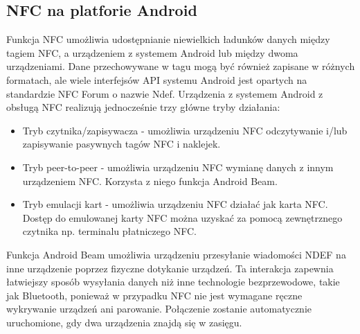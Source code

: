 \documentclass{article}
\numberwithin{equation}{section}
\begin{document}
\subsection{NFC na platforie Android}
Funkcja NFC umożliwia udostępnianie niewielkich ładunków danych między tagiem NFC, a urządzeniem z systemem Android lub między dwoma urządzeniami. Dane przechowywane w tagu mogą być również zapisane w różnych formatach, ale wiele interfejsów API systemu Android jest opartych na standardzie NFC Forum o nazwie Ndef. Urządzenia z systemem Android z obsługą NFC realizują jednocześnie trzy główne tryby działania:
\begin{itemize}
\item Tryb czytnika/zapisywacza - umożliwia urządzeniu NFC odczytywanie i/lub zapisywanie pasywnych tagów NFC i naklejek.
\item Tryb peer-to-peer - umożliwia urządzeniu NFC wymianę danych z innym urządzeniem NFC. Korzysta z niego funkcja Android Beam.
\item Tryb emulacji kart - umożliwia urządzeniu NFC działać jak karta NFC. Dostęp do emulowanej karty NFC można uzyskać za pomocą zewnętrznego czytnika np. terminalu płatniczego NFC.
\end{itemize}
 Funkcja Android Beam umożliwia urządzeniu przesyłanie wiadomości NDEF na inne urządzenie poprzez fizyczne dotykanie urządzeń. Ta interakcja zapewnia łatwiejszy sposób wysyłania danych niż inne technologie bezprzewodowe, takie jak Bluetooth, ponieważ w przypadku NFC nie jest wymagane ręczne wykrywanie urządzeń ani parowanie. Połączenie zostanie automatycznie uruchomione, gdy dwa urządzenia znajdą się w zasięgu.
\end{document}
